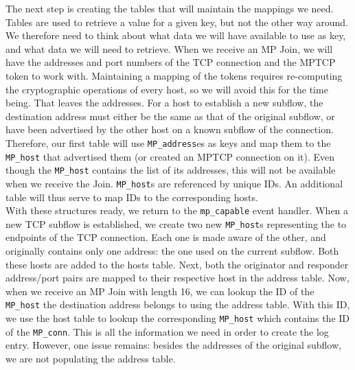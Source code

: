 The next step is creating the tables that will maintain the mappings we need. Tables are used to retrieve a value for a given key, but not the other way around. We therefore need to think about what data we will have available to use as key, and what data we will need to retrieve. When we receive an MP Join, we will have the addresses and port numbers of the TCP connection and the MPTCP token to work with. Maintaining a mapping of the tokens requires re-computing the cryptographic operations of every host, so we will avoid this for the time being. That leaves the addresses. For a host to establish a new subflow, the destination address must either be the same as that of the original subflow, or have been advertised by the other host on a known subflow of the connection. Therefore, our first table will use \texttt{MP\_address}es as keys and map them to the \texttt{MP\_host} that advertised them (or created an MPTCP connection on it). Even though the \texttt{MP\_host} contains the list of its addresses, this will not be available when we receive the Join. \texttt{MP\_host}s are referenced by unique IDs. An additional table will thus serve to map IDs to the corresponding hosts.\\

With these structures ready, we return to the \texttt{mp\_capable} event handler. When a new TCP subflow is established, we create two new \texttt{MP\_host}s representing the to endpoints of the TCP connection. Each one is made aware of the other, and originally contains only one address: the one used on the current subflow. Both these hosts are added to the hosts table. Next, both the originator and responder address/port pairs are mapped to their respective host in the address table. Now, when we receive an MP Join with length 16, we can lookup the ID of the \texttt{MP\_host} the destination address belongs to using the address table. With this ID, we use the host table to lookup the corresponding \texttt{MP\_host} which contains the ID of the \texttt{MP\_conn}. This is all the information we need in order to create the log entry. However, one issue remains: besides the addresses of the original subflow, we are not populating the address table. \\

